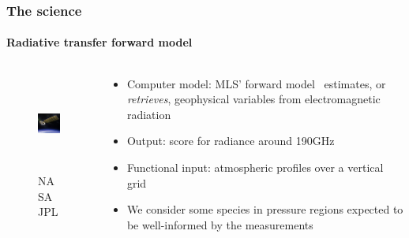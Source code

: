 \documentclass{snedecorbeamer}
\begin{document}
\begin{frame}[c]
  \frametitle{The science}
  \framesubtitle{Radiative transfer forward model}

  \begin{columns}[c]
    \begin{column}{0.2\textwidth}
      \begin{figure}
        \centering
        \includegraphics[height=8.5em]{inc/mls_aura}
        \caption*{
          \href{https://www.jpl.nasa.gov/missions/microwave-limb-sounder-mls}{}
          NASA JPL}
      \end{figure}
    \end{column}
    \begin{column}{0.7\textwidth}
      \begin{itemize}
      \item Computer model: MLS' forward
        model~\cite{read2006,schwartz2006,waters2006} estimates, or
        \emph{retrieves}, geophysical variables from electromagnetic radiation
      \item Output: score for radiance around 190GHz~\cite{johnson2020}
      \item Functional input: atmospheric profiles over a vertical grid
      \item We consider some species in pressure regions expected to be
        well-informed by the measurements~\cite{liversey2020}
      \end{itemize}
    \end{column}
  \end{columns}
\end{frame}
\end{document}
